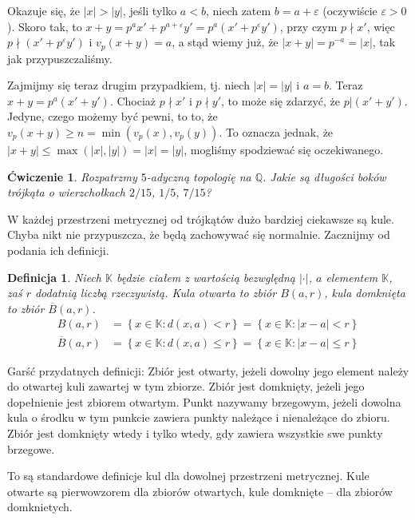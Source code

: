 \documentclass[a4paper,fleqn]{article}
\newtheorem{prb}[prbh]{\'Cwiczenie}
\newtheorem{dff}{Definicja}
\begin{document}
\begin{multicols}{2}
Okazuje się, że $|x| > |y|$, jeśli tylko $a < b$, niech zatem $b = a + \varepsilon$ (oczywiście $\varepsilon > 0$). Skoro tak, to $x  +y = p^ax' + p^{a+\varepsilon} y' = p ^a\left(x' + p^\varepsilon y'\right)$,
przy czym $p\nmid x'$, więc $p \nmid (x' + p^\varepsilon y')$ i $v_p(x+y) = a$, a stąd wiemy już, że $|x+y | = p^{-a} = |x|$, tak jak przypuszczaliśmy.

Zajmijmy się teraz drugim przypadkiem, tj. niech $|x| = |y|$ i $a = b$.  Teraz $x+y = p^a(x'+y')$. Chociaż $p\nmid x'$ i $p \nmid y'$, to może się zdarzyć, że $p | (x'+y')$. Jedyne, czego możemy być pewni, to to, że $v_p(x+y) \ge n = \min(v_p(x), v_p(y))$. To oznacza jednak, że $|x+y| \le \max(|x|, |y|) = |x| = |y|$, mogliśmy spodziewać się oczekiwanego.

\begin{prb}Rozpatrzmy $5$-adyczną topologię na $\mathbb Q$. Jakie są długości boków trójkąta o wierzchołkach $2/15$, $1/5$, $7/15$?\end{prb}

W każdej przestrzeni metrycznej od trójkątów dużo bardziej ciekawsze są kule. Chyba nikt nie przypuszcza, że będą zachowywać się normalnie. Zacznijmy od podania ich definicji.

\begin{dff}Niech $\mathbb K$ będzie ciałem z wartością bezwględną  $|\cdot|$, $a$ elementem $\mathbb K$, zaś $r$ dodatnią liczbą rzeczywistą. Kula otwarta to zbiór $B(a,r)$, kula domknięta to zbiór $\overline{B}(a,r)$.
\begin{align*}
B(a,r) & = \left\{x\in\mathbb K: d(x,a) < r \right\} = \left\{x\in\mathbb K: |x-a| < r \right\} \\
\overline{B}(a,r) & = \left\{x\in\mathbb K: d(x,a) \le r \right\} = \left\{x\in\mathbb K: |x-a| \le r \right\}
\end{align*}
\end{dff}

Garść przydatnych definicji: {Zbiór jest otwarty, jeżeli dowolny jego element należy do otwartej kuli zawartej w tym zbiorze. Zbiór jest domknięty, jeżeli jego dopełnienie jest zbiorem otwartym. Punkt nazywamy brzegowym, jeżeli dowolna kula o środku w tym punkcie zawiera punkty należące i nienależące do zbioru. Zbiór jest domknięty wtedy i tylko wtedy, gdy zawiera wszystkie swe punkty brzegowe.}

To są standardowe definicje kul dla dowolnej przestrzeni metrycznej. Kule otwarte są pierwowzorem dla zbiorów otwartych, kule domknięte -- dla zbiorów domknietych.


\end{multicols}
\end{document}
